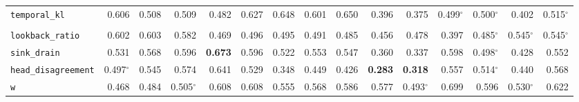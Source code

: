 \begin{table}[t]
\begin{tabular}{@{}lrrrrrrrrrrrrrr@{}}
\texttt{temporal\_kl} & \cellcolor[HTML]{C1D3E9}0.606 & \cellcolor[HTML]{ECEDEC}0.508 & \cellcolor[HTML]{ECEDEC}0.509 & \cellcolor[HTML]{F1E9E5}0.482 & \cellcolor[HTML]{B8CEE9}0.627 & \cellcolor[HTML]{AFC8E8}0.648 & \cellcolor[HTML]{C3D4E9}0.601 & \cellcolor[HTML]{AEC7E8}0.650 & \cellcolor[HTML]{F3CBC4}0.396 & \cellcolor[HTML]{F3C3BC}0.375 & \cellcolor[HTML]{F0EEEB}0.499$^{\circ}$ & \cellcolor[HTML]{F0EFEC}0.500$^{\circ}$ & \cellcolor[HTML]{F3CDC6}0.402 & \cellcolor[HTML]{E9EBEC}0.515$^{\circ}$ \\
\addlinespace
\multicolumn{15}{l}{\emph{attention pattern}} \\
\texttt{lookback\_ratio} & \cellcolor[HTML]{C3D4E9}0.602 & \cellcolor[HTML]{C3D4E9}0.603 & \cellcolor[HTML]{CCD9EA}0.582 & \cellcolor[HTML]{F1E4E0}0.469 & \cellcolor[HTML]{F0EEEB}0.496 & \cellcolor[HTML]{F0EDEA}0.495 & \cellcolor[HTML]{F0ECE9}0.491 & \cellcolor[HTML]{F1EAE6}0.485 & \cellcolor[HTML]{F2E0DB}0.456 & \cellcolor[HTML]{F1E7E3}0.478 & \cellcolor[HTML]{F3CBC5}0.397 & \cellcolor[HTML]{F1EAE6}0.485$^{\circ}$ & \cellcolor[HTML]{DCE3EB}0.545$^{\circ}$ & \cellcolor[HTML]{DCE3EB}0.545$^{\circ}$ \\
\texttt{sink\_drain} & \cellcolor[HTML]{E2E7EB}0.531 & \cellcolor[HTML]{D2DDEA}0.568 & \cellcolor[HTML]{C6D6EA}0.596 & \cellcolor[HTML]{A4C1E7}\textbf{0.673} & \cellcolor[HTML]{C6D6EA}0.596 & \cellcolor[HTML]{E6E9EC}0.522 & \cellcolor[HTML]{D9E1EB}0.553 & \cellcolor[HTML]{DBE3EB}0.547 & \cellcolor[HTML]{F3BEB7}0.360 & \cellcolor[HTML]{F3B6AE}0.337 & \cellcolor[HTML]{C5D5EA}0.598 & \cellcolor[HTML]{F0EEEB}0.498$^{\circ}$ & \cellcolor[HTML]{F2D6D0}0.428 & \cellcolor[HTML]{D9E1EB}0.552 \\
\texttt{head\_disagreement} & \cellcolor[HTML]{F0EEEB}0.497$^{\circ}$ & \cellcolor[HTML]{DCE3EB}0.545 & \cellcolor[HTML]{CFDBEA}0.574 & \cellcolor[HTML]{B2CAE8}0.641 & \cellcolor[HTML]{E3E7EB}0.529 & \cellcolor[HTML]{F3B9B2}0.348 & \cellcolor[HTML]{F2DDD8}0.449 & \cellcolor[HTML]{F3D5D0}0.426 & \cellcolor[HTML]{F1A29A}\textbf{0.283} & \cellcolor[HTML]{F2AFA7}\textbf{0.318} & \cellcolor[HTML]{D7E0EB}0.557 & \cellcolor[HTML]{EAEBEC}0.514$^{\circ}$ & \cellcolor[HTML]{F2DAD5}0.440 & \cellcolor[HTML]{D2DDEA}0.568 \\
\texttt{w} & \cellcolor[HTML]{F1E4E0}0.468 & \cellcolor[HTML]{F1E9E6}0.484 & \cellcolor[HTML]{EEEEEC}0.505$^{\circ}$ & \cellcolor[HTML]{C0D3E9}0.608 & \cellcolor[HTML]{C0D2E9}0.608 & \cellcolor[HTML]{D8E1EB}0.555 & \cellcolor[HTML]{D2DDEA}0.568 & \cellcolor[HTML]{CAD8EA}0.586 & \cellcolor[HTML]{CEDBEA}0.577 & \cellcolor[HTML]{F0ECE9}0.493$^{\circ}$ & \cellcolor[HTML]{99BAE5}0.699 & \cellcolor[HTML]{C6D6EA}0.596 & \cellcolor[HTML]{E3E7EB}0.530$^{\circ}$ & \cellcolor[HTML]{BACFE9}0.622 \\

\end{tabular}
\end{table}
